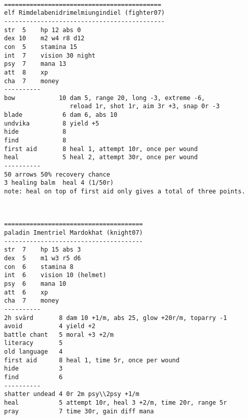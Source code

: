 \

\goodbreak
\tiny \begin{samepage} \begin{verbatim}
===========================================
elf Rimdelabenidrimelmiungindiel (fighter07)
--------------------------------------------
str  5    hp 12 abs 0
dex 10    m2 w4 r8 d12
con  5    stamina 15
int  7    vision 30 night
psy  7    mana 13
att  8    xp
cha  7    money
----------
bow            10 dam 5, range 20, long -3, extreme -6,
                  reload 1r, shot 1r, aim 3r +3, snap 0r -3
blade           6 dam 6, abs 10
undvika         8 yield +5
hide            8
find            8
first aid       8 heal 1, attempt 10r, once per wound
heal            5 heal 2, attempt 30r, once per wound
----------
50 arrows 50% recovery chance
3 healing balm  heal 4 (1/50r)
note: heal on top of first aid only gives a total of three points.
\end{verbatim} \end{samepage} \normalsize


\

\goodbreak
\tiny \begin{samepage} \begin{verbatim}
======================================
paladin Imentriel Mardokhat (knight07)
--------------------------------------
str  7    hp 15 abs 3
dex  5    m1 w3 r5 d6
con  6    stamina 8
int  6    vision 10 (helmet)
psy  6    mana 10
att  6    xp
cha  7    money
----------
2h svärd       8 dam 10 +1/m, abs 25, glow +20r/m, toparry -1
avoid          4 yield +2
battle chant   5 moral +3 +2/m
literacy       5
old language   4
first aid      8 heal 1, time 5r, once per wound
hide           3
find           6
----------
shatter undead 4 0r 2m psy\\2psy +1/m
heal           5 attempt 10r, heal 3 +2/m, time 20r, range 5r
pray           7 time 30r, gain diff mana
\end{verbatim} \end{samepage} \normalsize


\

